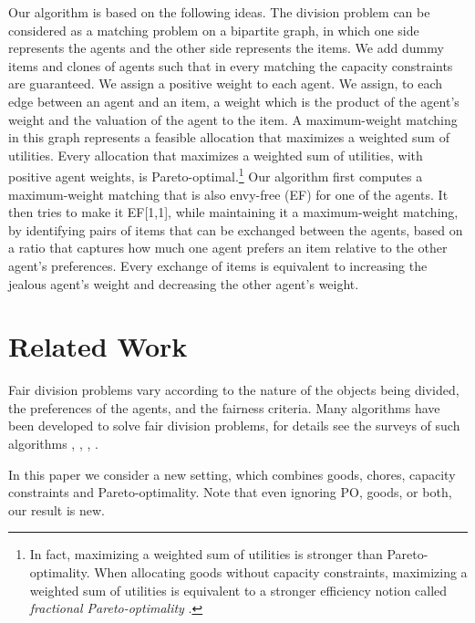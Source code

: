 \documentclass[sigconf]{aamas}
\theoremstyle{definition}
\begin{document}
Our algorithm  is based on the following ideas. 
The division problem can be considered as a matching problem on a bipartite graph, in which one side represents the agents and the other side represents the items. We add dummy items and clones of agents such that in every matching the capacity constraints are guaranteed. 
We assign a positive weight to each agent. We assign, to each edge between an agent and an item, a weight which is the product of the agent's weight and the valuation of the agent to the item.
A maximum-weight matching in this graph represents a feasible allocation that maximizes a weighted sum of utilities. 
Every allocation that maximizes a weighted sum of utilities, with positive agent weights, is Pareto-optimal.\footnote{
In fact, maximizing a weighted sum of utilities is stronger than Pareto-optimality. 
When allocating goods without capacity constraints, 
maximizing a weighted sum of utilities is equivalent to a stronger efficiency notion called \emph{fractional Pareto-optimality} \cite{negishi1960welfare,varian1976two,barman2018finding}.
}
Our algorithm first computes a maximum-weight matching that is also envy-free (EF) for one of the agents. It then tries to make it EF[1,1], while maintaining it a maximum-weight matching, by identifying pairs of items that can be exchanged between the agents, based on a ratio that captures how much one agent prefers an item relative to the other agent's preferences. 
Every exchange of items is equivalent to increasing the jealous agent's weight and decreasing the other agent's weight. 




\section{Related Work}
Fair division problems vary according to the nature of the objects being divided, the preferences of the agents, and the fairness criteria. Many algorithms have been developed to solve fair division problems, for details see the surveys of such algorithms \cite{brams1996fair},  \cite{moulin2004fair}, \cite{brams2007mathematics}, \cite{bouveret2016fair}.

In this paper we consider a new setting, which combines goods, chores, capacity constraints and Pareto-optimality. Note that even ignoring PO, goods, or both, our result is new.
\end{document}
